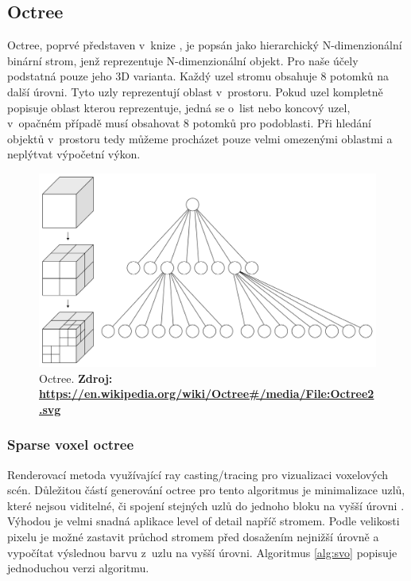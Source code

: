 \subsection{Octree} \label{octree}
Octree, poprvé představen v~knize \cite{rensselaer1980octree}, je popsán jako hierarchický N-dimenzionální binární strom, jenž reprezentuje N-dimenzionální objekt. Pro naše účely podstatná pouze jeho 3D varianta. Každý uzel stromu obsahuje 8 potomků na další úrovni. Tyto uzly reprezentují oblast v~prostoru. Pokud uzel kompletně popisuje oblast kterou reprezentuje, jedná se o~list nebo koncový uzel, v~opačném případě musí obsahovat 8 potomků pro podoblasti. Při hledání objektů v~prostoru tedy můžeme procházet pouze velmi omezenými oblastmi a neplýtvat výpočetní výkon.

\begin{figure}[H]
	\centering
	\includegraphics[scale=0.1]{obrazky-figures/Octree2.pdf}
	\caption{Octree. \textbf{Zdroj: \url{https://en.wikipedia.org/wiki/Octree#/media/File:Octree2.svg}}}
	\label{fig:slabs}
\end{figure}


\subsubsection{Sparse voxel octree}\label{svo_alg}
Renderovací metoda využívající ray casting/tracing pro vizualizaci voxelových scén. Důležitou částí generování octree pro tento algoritmus je minimalizace uzlů, které nejsou viditelné, či spojení stejných uzlů do jednoho bloku na vyšší úrovni \cite{Laine2011EfficientSV}. Výhodou je velmi snadná aplikace level of detail napříč stromem. Podle velikosti pixelu je možné zastavit průchod stromem před dosažením nejnižší úrovně a vypočítat výslednou barvu z~uzlu na vyšší úrovni. Algoritmus \ref{alg:svo} popisuje jednoduchou verzi algoritmu.

